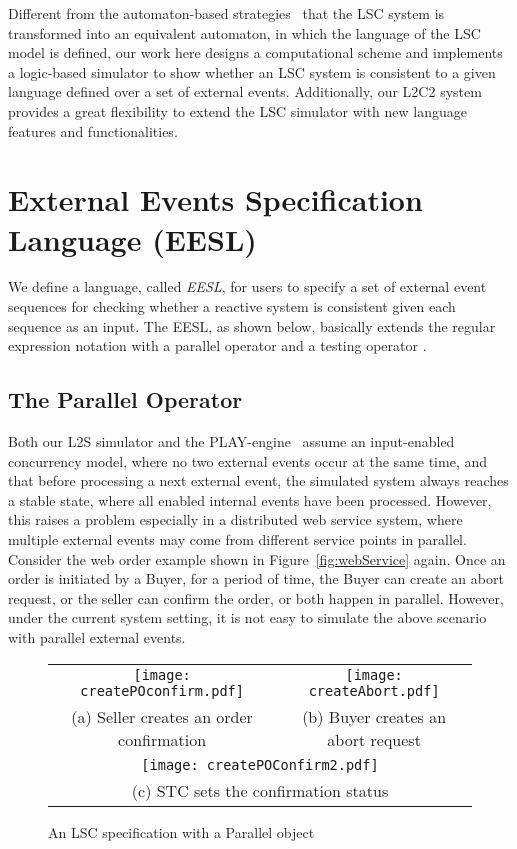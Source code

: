 \documentclass[]{llncs}
\begin{document}
Different from the automaton-based strategies~\cite{HK99,BH01,KTWW06,KM08}
that the LSC system is transformed into an equivalent automaton, in which the
language of the LSC model is defined, our work here designs a
computational scheme and implements a logic-based simulator to show whether
an LSC system is consistent to a given language defined over a set of external events.
Additionally, our L2C2 system provides a great flexibility to extend the LSC
simulator with new language features and functionalities.

\section{External Events Specification Language (EESL)}
\label{sec:eesl}

We define a language, called {\em EESL}, for users to specify a set of external
event sequences for checking whether a reactive system is consistent given each
sequence as an input. The EESL, as shown below, basically extends the regular
expression notation with a parallel operator  and
a testing operator .


\subsection{The Parallel Operator }

Both our L2S simulator and the PLAY-engine~\cite{HM03}
assume an input-enabled concurrency model, where no two
external events occur at the same time, and that before processing
a next external event, the simulated system always reaches a stable state,
where all enabled internal events have been processed.
However, this raises a problem especially in a distributed web service system,
where multiple external events may come from different service points in parallel.
Consider the web order example shown in Figure~\ref{fig:webService} again.
Once an order is initiated by a Buyer, for a period of time,
the Buyer can create an abort request, or the seller can confirm
the order, or both happen in parallel.
However, under the current system setting, it is not easy
to simulate the above scenario with parallel external events.

\begin{figure*}[!ht]
	\centering
	\begin{tabular}{cc}
		\texttt{[image: createPOconfirm.pdf]}
		&
		\texttt{[image: createAbort.pdf]} \\
	  (a) Seller creates an order confirmation
	  &
	  (b) Buyer creates an abort request \\
	
\multicolumn{2}{c}{
	  \texttt{[image: createPOConfirm2.pdf]}} \\
\multicolumn{2}{c}{
		  (c) STC sets the confirmation status}
	\end{tabular}
\caption{An LSC specification with a Parallel object}
\label{fig:ws2}
\end{figure*}
\end{document}
